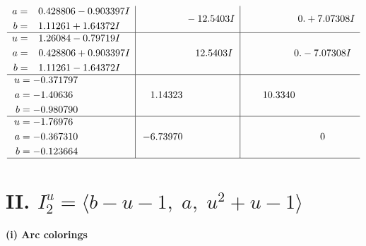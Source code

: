 \documentclass[1p]{elsarticle_modified}
\theoremstyle{definition}
\begin{document}
$$\begin{array}{c|c|c}
\begin{aligned}
a &= \phantom{-}0.428806 - 0.903397 I \\
b &= \phantom{-}1.11261 + 1.64372 I\end{aligned}
 & \phantom{-0.000000 } -12.5403 I & \phantom{-0.000000 -}0. + 7.07308 I \\ \hline\begin{aligned}
u &= \phantom{-}1.26084 - 0.79719 I \\
a &= \phantom{-}0.428806 + 0.903397 I \\
b &= \phantom{-}1.11261 - 1.64372 I\end{aligned}
 & \phantom{-0.000000 -}12.5403 I & \phantom{-0.000000 } 0. - 7.07308 I \\ \hline\begin{aligned}
u &= -0.371797\phantom{ +0.000000I} \\
a &= -1.40636\phantom{ +0.000000I} \\
b &= -0.980790\phantom{ +0.000000I}\end{aligned}
 & \phantom{-}1.14323\phantom{ +0.000000I} & \phantom{-}10.3340\phantom{ +0.000000I} \\ \hline\begin{aligned}
u &= -1.76976\phantom{ +0.000000I} \\
a &= -0.367310\phantom{ +0.000000I} \\
b &= -0.123664\phantom{ +0.000000I}\end{aligned}
 & -6.73970\phantom{ +0.000000I} & \phantom{-0.000000 } 0\\
 \hline 
 \end{array}$$\newpage\newpage\renewcommand{\arraystretch}{1}
\centering \section*{II. $I^u_{2}= \langle b- u-1,\;a,\;u^2+u-1 \rangle$}
\flushleft \textbf{(i) Arc colorings}\\
\end{document}
